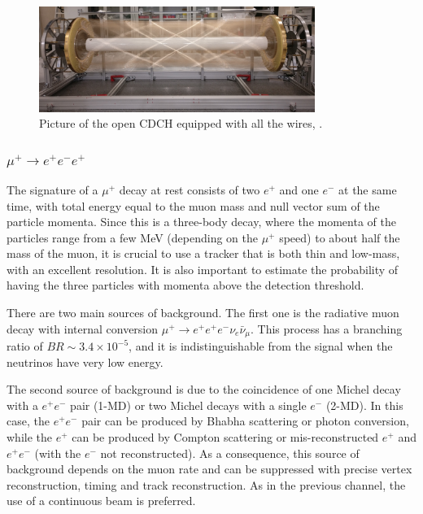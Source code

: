 \begin{figure}[!h]
\centering
\includegraphics[width =0.8\textwidth]{figures/png/Screenshot_20240307_140235.png}
\caption[MEG II detector (II).]{Picture of the open CDCH equipped with all the wires, \cite{megiicollaboration2024operation}.}
\label{fig:meg2}
\end{figure}






\subsubsection{$\mu^+ \rightarrow e^+ e^-  e^+ $}
The signature of a $\mu^+$ decay at rest consists of two $e^+$ and one $e^-$ at the same time, 
with total energy equal to the muon mass and null vector sum of the
particle momenta.
Since this is a three-body decay, where the momenta of the particles 
range from a few MeV (depending on the $\mu^+$ speed) to about half the mass of the muon, it is crucial 
to use a tracker that is both thin and low-mass, with an excellent resolution. 
It is also important to estimate the probability
of having the three particles with momenta above the detection threshold.

There are two main sources of background. The first one is the radiative muon decay with 
internal conversion $\mu^+ \rightarrow e^+ e^+ e^- \nu_e \bar{\nu}_\mu$. 
This process has a branching ratio of $BR\sim 3.4 \times 10^{-5}$, and it is 
indistinguishable from the signal when the neutrinos have very low energy. 

The second source of background is due to the coincidence 
of one Michel decay with a $e^+e^-$ pair (1-MD) or two Michel decays with a single $e^-$ (2-MD). 
In this case, the $e^+e^-$ pair can be produced by Bhabha scattering or photon conversion, while the $e^+$
can be produced by Compton scattering or mis-reconstructed $e^+$ and $e^+e^-$ (with the $e^-$ not reconstructed). 
As a consequence, this source of background depends on the muon rate and
can be suppressed with precise vertex reconstruction, timing and track reconstruction.
As in the previous channel, the use of a continuous beam is preferred.


